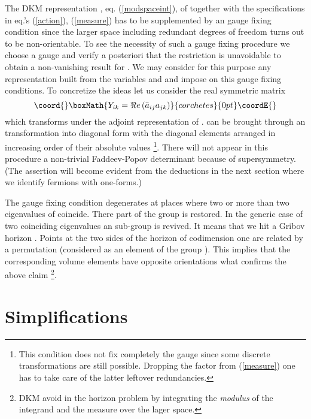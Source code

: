 \documentclass[a4paper,12pt]{article}
\begin{document}
The DKM representation , eq. (\ref{modspaceint}), of \coordHE{} 
together with the specifications in eq.'s (\ref{action}), 
(\ref{measure}) has to be supplemented by an \coordHE{} gauge fixing  
condition since the larger 
space including redundant \coordHE{} degrees of freedom turns out to 
be non-orientable. To see the necessity of such a gauge fixing 
procedure we choose a gauge and verify a posteriori that the 
restriction is unavoidable to obtain a non-vanishing result 
for \coordHE{}. We may consider for this purpose any representation 
built from the variables \coordHE{} and \coordHE{} and impose on this gauge 
fixing conditions. To concretize the ideas let us consider the real 
symmetric matrix 
\[\coord{}\boxMath{
Y_{ik}=\Re e \left(\bar{a}_{ij}a_{jk}\right)
}{corchetes}{0pt}\coordE{}\]
which transforms under the adjoint representation of \coordHE{}. \coordHE{} 
can be brought through an \coordHE{} transformation into diagonal 
form with the diagonal elements arranged in increasing order of 
their absolute values \footnote{
This condition does not fix completely the gauge since some 
discrete transformations are still possible. Dropping
the factor \coordHE{} from (\ref{measure}) one has to take 
care of the latter leftover redundancies.}. There will not appear 
in this procedure a 
non-trivial Faddeev-Popov determinant because of supersymmetry. 
(The assertion will become evident from the deductions in the 
next section where we identify fermions with one-forms.)

The gauge fixing condition degenerates at places where two or more 
than two eigenvalues of \coordHE{} coincide. There part of the \coordHE{} 
group is restored. In the generic case of two coinciding eigenvalues 
an \coordHE{} sub-group is revived. It means that we hit a Gribov 
horizon \cite{gribov}. Points at the two sides of the horizon 
of codimension one are 
related by a permutation (considered as an element of the group 
\coordHE{}). This implies that the corresponding volume elements have 
opposite orientations what confirms the above claim 
\footnote{DKM avoid in \cite{dorey1} 
the horizon problem  by integrating the {\it modulus} of the integrand 
and the measure over the lager space.}. 

\section{Simplifications}\label{sec:III} 
\end{document}
